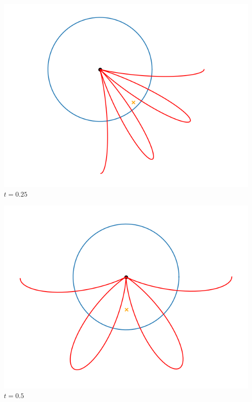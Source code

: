 \documentclass[11pt,class=report,crop=false]{standalone}
\begin{document}
\begin{center}
	\begin{minipage}{0.24\textwidth}
	\center \includegraphics[scale=\myscale,scale=0.3]{figures/fourier-6-025}
	$t = 0.25$ 
	\end{minipage}
	\begin{minipage}{0.24\textwidth}
	\center \includegraphics[scale=\myscale,scale=0.3]{figures/fourier-6-050}
	$t = 0.5$ 
	\end{minipage}
	\begin{minipage}{0.24\textwidth}

\end{minipage}
\end{center}
\end{document}
